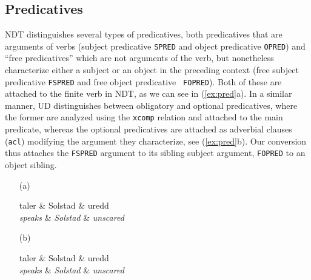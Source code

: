 \documentclass[10pt, a4paper]{article}
\let\w=\emph
\begin{document}
\subsection{Predicatives}
NDT distinguishes several types of predicatives, both predicatives
that are arguments of verbs (subject predicative {\tt SPRED} and
object predicative {\tt OPRED}) and ``free predicatives'' which are
not arguments of the verb, but nonetheless characterize either a
subject or an object in the preceding context (free subject
predicative {\tt FSPRED} and free object predicative {\tt
  FOPRED}). Both of these are attached to the finite verb in NDT, as we can see in (\ref{ex:pred}a). In a
similar manner, UD distinguishes between obligatory and optional
predicatives, where the former are analyzed using the {\tt xcomp}
relation and attached to the main predicate, whereas the optional
predicatives are attached as adverbial clauses ({\tt acl}) modifying the argument
they characterize, see (\ref{ex:pred}b). Our conversion thus attaches the {\tt FSPRED} argument to its sibling subject argument, {\tt FOPRED} to an object sibling.
\begin{examples}
\item\label{ex:pred}
\begin{itemize}
\item[(a)]
    \begin{dependency}[arc edge, text only label, theme=simple]
        \begin{deptext}[column sep=.2cm]
          taler \& Solstad \& uredd \\
          \w{speaks} \& \w{Solstad} \& \w{unscared} \\
        \end{deptext}
    \end{dependency}
\item[(b)]
    \begin{dependency}[arc edge, text only label, theme=simple]
        \begin{deptext}[column sep=.2cm]
          taler \& Solstad \& uredd \\
          \w{speaks} \& \w{Solstad} \& \w{unscared} \\
        \end{deptext}
    \end{dependency}
\end{itemize}
\end{examples}
\end{document}
